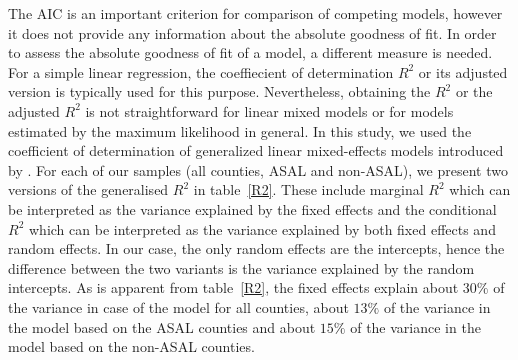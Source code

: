 \documentclass[12pt]{iopart}
\begin{document}
The AIC is an important criterion for comparison of competing models, however it does not provide any information about the absolute goodness of fit. In order to assess the absolute goodness of fit of a model, a different measure is needed. For a simple linear regression, the coeffiecient of determination $R^2$ or its adjusted version is typically used for this purpose. Nevertheless, obtaining the $R^2$ or the adjusted $R^2$ is not straightforward for linear mixed models or for models estimated by the maximum likelihood in general. In this study, we used the coefficient of determination of generalized linear mixed-effects models introduced by \cite{Nakagawa2013}. For each of our samples (all counties, ASAL and non-ASAL), we present two versions of the generalised $R^2$ in table~\ref{R2}. These include marginal $R^2$ which can be interpreted as the variance explained by the fixed effects and the conditional $R^2$ which can be interpreted as the variance explained by both fixed effects and random effects. In our case, the only random effects are the intercepts, hence the difference between the two variants is the variance explained by the random intercepts. As is apparent from table~\ref{R2}, the fixed effects explain about $30\%$ of the variance in case of the model for all counties,  about $13\%$ of the variance in the model based on the ASAL counties and about $15\%$ of the variance in the model based on the non-ASAL counties.
\end{document}
